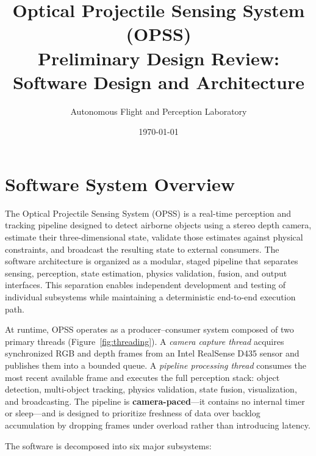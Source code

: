 \documentclass[11pt, letterpaper]{article}
\title{%
  \textbf{Optical Projectile Sensing System (OPSS)}\\[0.3em]
  \Large Preliminary Design Review:\\
  Software Design and Architecture%
}
\author{Autonomous Flight and Perception Laboratory}
\date{\today}
\begin{document}
\maketitle
\thispagestyle{fancy}

\section{Software System Overview}

The Optical Projectile Sensing System (OPSS) is a real-time perception
and tracking pipeline designed to detect airborne objects using a
stereo depth camera, estimate their three-dimensional state, validate
those estimates against physical constraints, and broadcast the
resulting state to external consumers.  The software architecture is
organized as a modular, staged pipeline that separates sensing,
perception, state estimation, physics validation, fusion, and output
interfaces.  This separation enables independent development and
testing of individual subsystems while maintaining a deterministic
end-to-end execution path.

At runtime, OPSS operates as a producer--consumer system composed of
two primary threads (Figure~\ref{fig:threading}).  A \emph{camera
capture thread} acquires synchronized RGB and depth frames from an
Intel RealSense D435 sensor and publishes them into a bounded queue.
A \emph{pipeline processing thread} consumes the most recent available
frame and executes the full perception stack: object detection,
multi-object tracking, physics validation, state fusion,
visualization, and broadcasting.  The pipeline is \textbf{camera-paced}---it
contains no internal timer or sleep---and is designed to prioritize
freshness of data over backlog accumulation by dropping frames under
overload rather than introducing latency.

The software is decomposed into six major subsystems:
\end{document}
